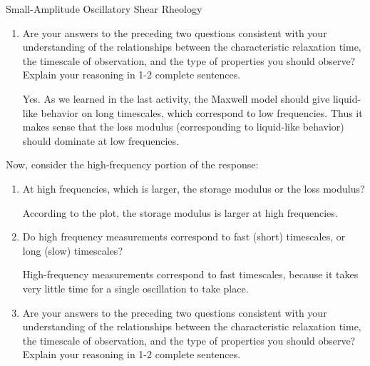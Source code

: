 \begin{activity}[extension]{Small-Amplitude Oscillatory Shear Rheology}
\begin{ctqs}
\begin{enumerate}
\begin{solution}[1in]
				\end{solution}
					
			\item Are your answers to the preceding two questions consistent with your understanding of the relationships between the characteristic relaxation time, the timescale of observation, and the type of properties you should observe?  Explain your reasoning in 1-2 complete sentences.
			
				\begin{solution}[2in]
				
					Yes. As we learned in the last activity, the Maxwell model should give liquid-like behavior on long timescales, which correspond to low frequencies.  Thus it makes sense that the loss modulus (corresponding to liquid-like behavior) should dominate at low frequencies.
				
				\end{solution}
	
		\end{enumerate}
	
	\question Now, consider the high-frequency portion of the response:
	
		\begin{enumerate}
		
			\item At high frequencies, which is larger, the storage modulus or the loss modulus?
	
					\begin{solution}[1in]
					
						According to the plot, the storage modulus is larger at high frequencies.
					
					\end{solution}
					
			\item Do high frequency measurements correspond to fast (short) timescales, or long (slow) timescales?
			
				\begin{solution}[1in]
				
					High-frequency measurements correspond to fast timescales, because it takes very little time for a single oscillation to take place.
				
				\end{solution}
					
			\item Are your answers to the preceding two questions consistent with your understanding of the relationships between the characteristic relaxation time, the timescale of observation, and the type of properties you should observe?  Explain your reasoning in 1-2 complete sentences.
			

\end{enumerate}
\end{ctqs}
\end{activity}
